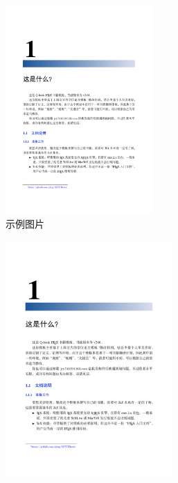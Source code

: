 \documentclass[10pt]{ctexart}
\begin{document}
\newpage
\begin{figure}
    \centering
    \includegraphics[width=0.5\textwidth]{9.png} %
    \caption{示例图片}
    \label{fig:example}
\end{figure}


\clearpage  %


\begin{figure}[t!]
    \vspace{-50pt}  %
    \hspace{-20pt}  %
    \raggedright  %
    \includegraphics[height=9cm]{9.png}  %
    \vspace{-70pt}  %
\end{figure}
\end{document}
